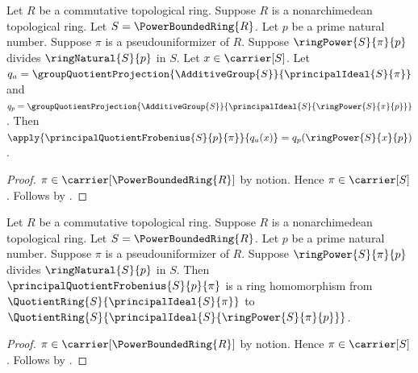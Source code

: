 \begin{proposition}\label{power_bounded_principal_frobenius_apply}
    Let $R$ be a commutative topological ring.
    Suppose $R$ is a nonarchimedean topological ring.
    Let $S=\PowerBoundedRing{R}$.
    Let $p$ be a prime natural number.
    Suppose $\pi$ is a pseudouniformizer of $R$.
    Suppose $\ringPower{S}{\pi}{p}$ divides
        $\ringNatural{S}{p}$ in $S$.
    Let $x\in\carrier[S]$.
    Let
        $q_a=\groupQuotientProjection{\AdditiveGroup{S}}{
            \principalIdeal{S}{\pi}}$ and
        $q_p=\groupQuotientProjection{\AdditiveGroup{S}}{
            \principalIdeal{S}{\ringPower{S}{\pi}{p}}}$.
    Then $\apply{\principalQuotientFrobenius{S}{p}{\pi}}{q_a(x)}
        =q_p(\ringPower{S}{x}{p})$.
\end{proposition}
\begin{proof}
    $\pi\in\carrier[\PowerBoundedRing{R}]$ by notion.
    Hence $\pi\in\carrier[S]$.
    Follows by .
\end{proof}

\begin{theorem}\label{power_bounded_principal_frobenius_hom}
    Let $R$ be a commutative topological ring.
    Suppose $R$ is a nonarchimedean topological ring.
    Let $S=\PowerBoundedRing{R}$.
    Let $p$ be a prime natural number.
    Suppose $\pi$ is a pseudouniformizer of $R$.
    Suppose $\ringPower{S}{\pi}{p}$ divides
        $\ringNatural{S}{p}$ in $S$.
    Then $\principalQuotientFrobenius{S}{p}{\pi}$ is a ring homomorphism
        from $\QuotientRing{S}{\principalIdeal{S}{\pi}}$ to
        $\QuotientRing{S}{
            \principalIdeal{S}{\ringPower{S}{\pi}{p}}}$.
\end{theorem}
\begin{proof}
    $\pi\in\carrier[\PowerBoundedRing{R}]$ by notion.
    Hence $\pi\in\carrier[S]$.
    Follows by .
\end{proof}

